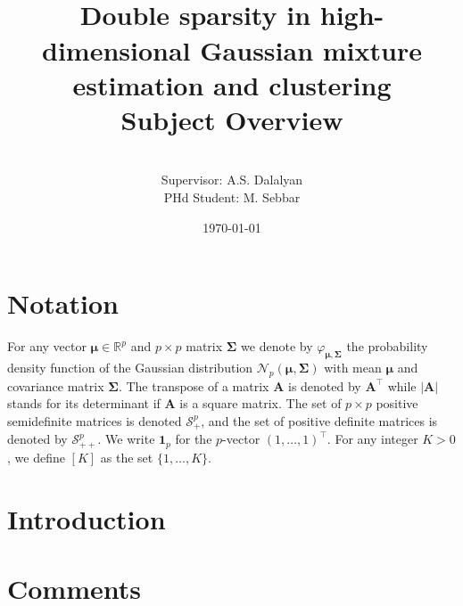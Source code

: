 \documentclass[a4paper,12pt]{article}
\title{\vspace{-60pt}~\\\textbf{\textsf{Double sparsity in high-dimensional Gaussian mixture estimation and clustering}}\\[20pt]
\textsf{Subject Overview}}
\author{\vspace{-20pt}~\\ \textsf{Supervisor: A.S. Dalalyan}\\
\textsf{PHd Student: M. Sebbar}}
\date{\today}
\let\bb\mathbb       %
\def\RR{{\bb R}}\def\ZZ{{\bb Z}}\def\FF{{\bb F}}\def\DD{{\bb D}}
\def\bb{\mathbb}
\def\bfA{\mathbf A}
\def\bSigma{\boldsymbol\Sigma}
\def\bmu{\boldsymbol\mu}
\def\b1{\mathbf 1}
\begin{document}
\maketitle
\tableofcontents
\newpage
\section{Notation}
For any vector $\bmu\in\RR^p$ and $p\times p$ matrix $\bSigma$ we denote by $\varphi_{\bmu,\bSigma}$ the probability density
function of the Gaussian distribution $\mathcal N_p(\bmu,\bSigma)$ with mean $\bmu$ and covariance matrix $\bSigma$.
The transpose of a matrix $\bfA $ is denoted by $\bfA ^\top$ while $|\bfA |$ stands for its determinant if $\bfA $ is a square matrix.
The set of $p\times p$ positive semidefinite matrices is denoted $\mathcal S_+^p$, and the set of positive definite
matrices is denoted by $\mathcal S_{++}^p$. We write $\b1_p$ for the $p$-vector $(1,\ldots,1)^\top$. For any integer $K>0$, we
define $[K]$ as the set $\{1,\ldots,K\}$.


\section{Introduction}



\newpage







\section{Comments}


\end{document}
